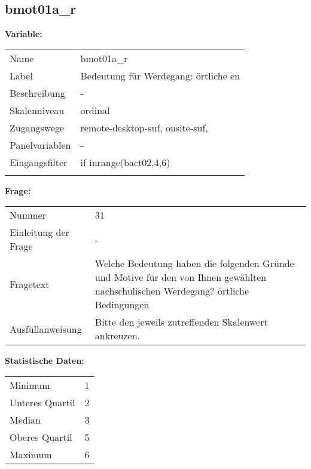 	
	
	\subsection{bmot01a\_r}
	\label{subSection:bmot01a_r}

	\noindent\textbf{Variable:}\\
		\begin{tabular}{lL{11.3cm}}
			\label{tableVariable:bmot01a_r}
			Name & bmot01a\_r \\
			Label & Bedeutung für Werdegang: örtliche en \\
			Beschreibung & - \\
			Skalenniveau & ordinal \\
			Zugangswege &
				remote-desktop-suf,
				onsite-suf,
 \\
			Panelvariablen & -
			 \\
			Eingangsfilter & if inrange(bact02,4,6)  \\
 \\
		\end{tabular}

		\vspace*{1 cm}
		\noindent\textbf{Frage:}\\
		\begin{tabular}{lL{11.3cm}}
			\label{tableQuestion:bmot01a_r}
			Nummer & 31 \\
			Einleitung der Frage & - \\
			Fragetext & Welche Bedeutung haben die folgenden Gründe und Motive für den von Ihnen gewählten nachschulischen Werdegang?
örtliche Bedingungen \\
			Ausfüllanweisung & Bitte den jeweils zutreffenden Skalenwert ankreuzen. \\
		\end{tabular}


		\vspace*{1 cm}
		\noindent\textbf{Statistische Daten:}\\
			\begin{tabular}{ll}
				\label{tableStatistics:bmot01a_r}
					Minimum & 1 \\
					Unteres Quartil & 2 \\
					Median & 3 \\
					Oberes Quartil & 5 \\
					Maximum & 6 \\
			\end{tabular}



